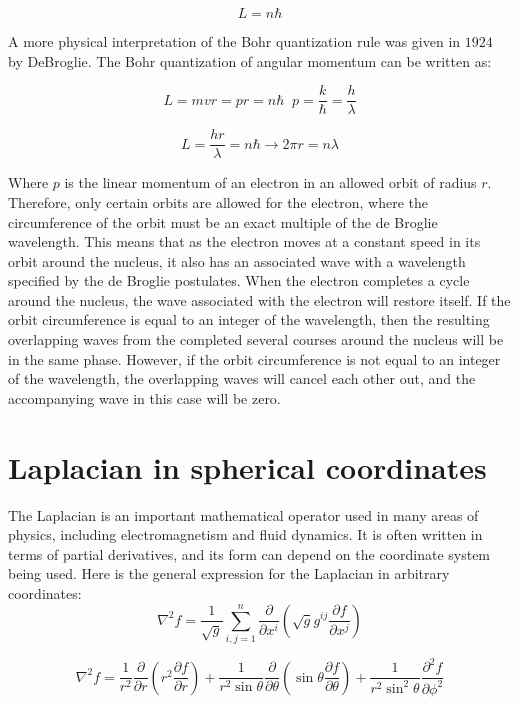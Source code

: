 \documentclass[spanish,notitlepage,letterpaper,11pt]{article} %
\numberwithin{equation}{subsection}
\begin{document}
        \begin{equation}
            L = n\hbar
        \end{equation}

        A more physical interpretation of the Bohr quantization rule was given in $1924$ by DeBroglie. The Bohr quantization of angular momentum can be written as: 

        \begin{equation*}
            L = mvr = pr = n\hbar  \;\; p = \frac{k}{\hbar}=\frac{h}{\lambda}
        \end{equation*}

        \begin{equation*}
            L = \frac{hr}{\lambda} = n\hbar \rightarrow 2\pi r = n\lambda
        \end{equation*}

        Where $p$ is the linear momentum of an electron in an allowed orbit of radius $r$. Therefore, only certain orbits are allowed for the electron, where the circumference of the orbit must be an exact multiple of the de Broglie wavelength. This means that as the electron moves at a constant speed in its orbit around the nucleus, it also has an associated wave with a wavelength specified by the de Broglie postulates. When the electron completes a cycle around the nucleus, the wave associated with the electron will restore itself. If the orbit circumference is equal to an integer of the wavelength, then the resulting overlapping waves from the completed several courses around the nucleus will be in the same phase. However, if the orbit circumference is not equal to an integer of the wavelength, the overlapping waves will cancel each other out, and the accompanying wave in this case will be zero. 


    \section{Laplacian in spherical coordinates}

    The Laplacian is an important mathematical operator used in many areas of physics, including electromagnetism and fluid dynamics. It is often written in terms of partial derivatives, and its form can depend on the coordinate system being used. Here is the general expression for the Laplacian in arbitrary coordinates:
    \begin{equation*}
        \nabla^2 f = \frac{1}{\sqrt{g}} \sum_{i,j=1}^n \frac{\partial}{\partial x^i} \left( \sqrt{g} g^{ij} \frac{\partial f}{\partial x^j} \right)
    \end{equation*}

    \begin{equation*}
        \nabla^2 f = \frac{1}{r^2} \frac{\partial}{\partial r} \left( r^2 \frac{\partial f}{\partial r} \right) + \frac{1}{r^2 \sin \theta} \frac{\partial}{\partial \theta} \left( \sin \theta \frac{\partial f}{\partial \theta} \right) + \frac{1}{r^2 \sin^2 \theta} \frac{\partial^2 f}{\partial \phi^2}
    \end{equation*}
    
{}

\end{document}
